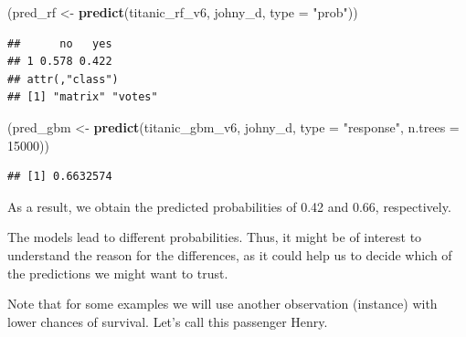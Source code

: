 \documentclass[12pt,]{krantz}
\newenvironment{Shaded}{\begin{snugshade}}{\end{snugshade}}
\newcommand{\DataTypeTok}[1]{\textcolor[rgb]{0.13,0.29,0.53}{#1}}
\newcommand{\DecValTok}[1]{\textcolor[rgb]{0.00,0.00,0.81}{#1}}
\newcommand{\KeywordTok}[1]{\textcolor[rgb]{0.13,0.29,0.53}{\textbf{#1}}}
\newcommand{\NormalTok}[1]{#1}
\newcommand{\StringTok}[1]{\textcolor[rgb]{0.31,0.60,0.02}{#1}}
\begin{document}
\begin{Shaded}
\begin{Highlighting}[]
\NormalTok{(pred\_rf \textless{}{-}}\StringTok{ }\KeywordTok{predict}\NormalTok{(titanic\_rf\_v6, johny\_d, }\DataTypeTok{type =} \StringTok{"prob"}\NormalTok{))}
\end{Highlighting}
\end{Shaded}

\begin{verbatim}
##      no   yes
## 1 0.578 0.422
## attr(,"class")
## [1] "matrix" "votes"
\end{verbatim}

\begin{Shaded}
\begin{Highlighting}[]
\NormalTok{(pred\_gbm \textless{}{-}}\StringTok{ }\KeywordTok{predict}\NormalTok{(titanic\_gbm\_v6, johny\_d, }\DataTypeTok{type =} \StringTok{"response"}\NormalTok{, }\DataTypeTok{n.trees =} \DecValTok{15000}\NormalTok{))}
\end{Highlighting}
\end{Shaded}

\begin{verbatim}
## [1] 0.6632574
\end{verbatim}

As a result, we obtain the predicted probabilities of 0.42 and 0.66, respectively.

The models lead to different probabilities. Thus, it might be of interest to understand the reason for the differences, as it could help us to decide which of the predictions we might want to trust.

Note that for some examples we will use another observation (instance) with lower chances of survival. Let's call this passenger Henry.
\end{document}
